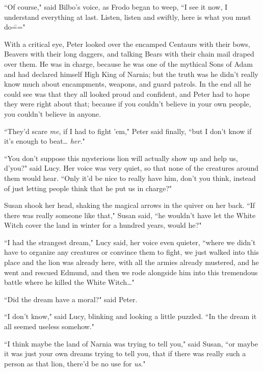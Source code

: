 ``Of course," said Bilbo's voice, as Frodo began to weep, ``I see it now, I understand everything at last. Listen, listen and swiftly, here is what you must do\==="


With a critical eye, Peter looked over the encamped Centaurs with their bows, Beavers with their long daggers, and talking Bears with their chain mail draped over them. He was in charge, because he was one of the mythical Sons of Adam and had declared himself High King of Narnia; but the truth was he didn't really know much about encampments, weapons, and guard patrols. In the end all he could see was that they all looked proud and confident, and Peter had to hope they were right about that; because if you couldn't believe in your own people, you couldn't believe in anyone.

``They'd scare \emph{me}, if I had to fight 'em," Peter said finally, ``but I don't know if it's enough to beat{\ldots} \emph{her.}"

``You don't suppose this mysterious lion will actually show up and help us, d'you?" said Lucy. Her voice was very quiet, so that none of the creatures around them would hear. ``Only it'd be nice to really have him, don't you think, instead of just letting people think that he put us in charge?"

Susan shook her head, shaking the magical arrows in the quiver on her back. ``If there was really someone like that," Susan said, ``he wouldn't have let the White Witch cover the land in winter for a hundred years, would he?"

``I had the strangest dream," Lucy said, her voice even quieter, ``where we didn't have to organize any creatures or convince them to fight, we just walked into this place and the lion was already here, with all the armies already mustered, and he went and rescued Edmund, and then we rode alongside him into this tremendous battle where he killed the White Witch{\ldots}"

``Did the dream have a moral?" said Peter.

``I don't know," said Lucy, blinking and looking a little puzzled. ``In the dream it all seemed useless somehow."

``I think maybe the land of Narnia was trying to tell you," said Susan, ``or maybe it was just your own dreams trying to tell you, that if there was really such a person as that lion, there'd be no use for \emph{us}."

